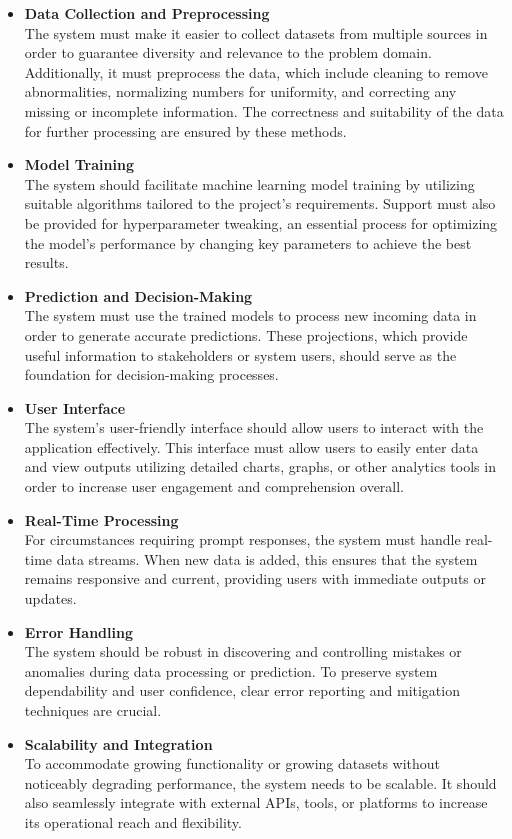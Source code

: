 \begin{itemize}
    \item \textbf{Data Collection and Preprocessing} \\
The system must make it easier to collect datasets from multiple sources in order to guarantee diversity and relevance to the problem domain. Additionally, it must preprocess the data, which include cleaning to remove abnormalities, normalizing numbers for uniformity, and correcting any missing or incomplete information. The correctness and suitability of the data for further processing are ensured by these methods.
    
    \item \textbf{Model Training} \\
The system should facilitate machine learning model training by utilizing suitable algorithms tailored to the project's requirements. Support must also be provided for hyperparameter tweaking, an essential process for optimizing the model's performance by changing key parameters to achieve the best results.

    \item \textbf{Prediction and Decision-Making} \\
The system must use the trained models to process new incoming data in order to generate accurate predictions. These projections, which provide useful information to stakeholders or system users, should serve as the foundation for decision-making processes.

    \item \textbf{User Interface} \\
The system's user-friendly interface should allow users to interact with the application effectively. This interface must allow users to easily enter data and view outputs utilizing detailed charts, graphs, or other analytics tools in order to increase user engagement and comprehension overall.

   \item \textbf{Real-Time Processing} \\
For circumstances requiring prompt responses, the system must handle real-time data streams. When new data is added, this ensures that the system remains responsive and current, providing users with immediate outputs or updates.

   \item \textbf{Error Handling} \\
The system should be robust in discovering and controlling mistakes or anomalies during data processing or prediction. To preserve system dependability and user confidence, clear error reporting and mitigation techniques are crucial.

   \item \textbf{Scalability and Integration} \\
To accommodate growing functionality or growing datasets without noticeably degrading performance, the system needs to be scalable. It should also seamlessly integrate with external APIs, tools, or platforms to increase its operational reach and flexibility.
\end{itemize}

